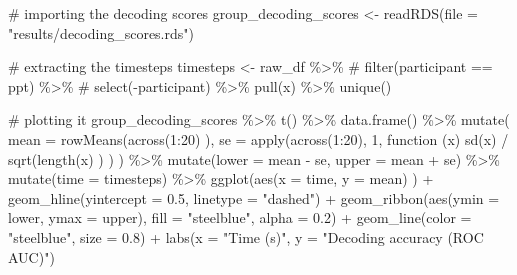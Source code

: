 \documentclass[
  doc,
  floatsintext,
  longtable,
  a4paper,
  nolmodern,
  notxfonts,
  notimes,
  colorlinks=true,linkcolor=blue,citecolor=blue,urlcolor=blue]{apa7}
\newenvironment{Shaded}{\begin{snugshade}}{\end{snugshade}}
\newcommand{\AttributeTok}[1]{\textcolor[rgb]{0.40,0.45,0.13}{#1}}
\newcommand{\CommentTok}[1]{\textcolor[rgb]{0.37,0.37,0.37}{#1}}
\newcommand{\ControlFlowTok}[1]{\textcolor[rgb]{0.00,0.23,0.31}{#1}}
\newcommand{\DecValTok}[1]{\textcolor[rgb]{0.68,0.00,0.00}{#1}}
\newcommand{\FloatTok}[1]{\textcolor[rgb]{0.68,0.00,0.00}{#1}}
\newcommand{\FunctionTok}[1]{\textcolor[rgb]{0.28,0.35,0.67}{#1}}
\newcommand{\NormalTok}[1]{\textcolor[rgb]{0.00,0.23,0.31}{#1}}
\newcommand{\OtherTok}[1]{\textcolor[rgb]{0.00,0.23,0.31}{#1}}
\newcommand{\SpecialCharTok}[1]{\textcolor[rgb]{0.37,0.37,0.37}{#1}}
\newcommand{\StringTok}[1]{\textcolor[rgb]{0.13,0.47,0.30}{#1}}
\begin{document}
\begin{Shaded}
\begin{Highlighting}[]
\CommentTok{\# importing the decoding scores}
\NormalTok{group\_decoding\_scores }\OtherTok{\textless{}{-}} \FunctionTok{readRDS}\NormalTok{(}\AttributeTok{file =} \StringTok{"results/decoding\_scores.rds"}\NormalTok{)}

\CommentTok{\# extracting the timesteps}
\NormalTok{timesteps }\OtherTok{\textless{}{-}}\NormalTok{ raw\_df }\SpecialCharTok{\%\textgreater{}\%}
    \CommentTok{\# filter(participant == ppt) \%\textgreater{}\%}
    \CommentTok{\# select({-}participant) \%\textgreater{}\%}
    \FunctionTok{pull}\NormalTok{(x) }\SpecialCharTok{\%\textgreater{}\%}
    \FunctionTok{unique}\NormalTok{()}

\CommentTok{\# plotting it}
\NormalTok{group\_decoding\_scores }\SpecialCharTok{\%\textgreater{}\%}
    \FunctionTok{t}\NormalTok{() }\SpecialCharTok{\%\textgreater{}\%}
    \FunctionTok{data.frame}\NormalTok{() }\SpecialCharTok{\%\textgreater{}\%}
    \FunctionTok{mutate}\NormalTok{(}
        \AttributeTok{mean =} \FunctionTok{rowMeans}\NormalTok{(}\FunctionTok{across}\NormalTok{(}\DecValTok{1}\SpecialCharTok{:}\DecValTok{20}\NormalTok{) ),}
        \AttributeTok{se =} \FunctionTok{apply}\NormalTok{(}\FunctionTok{across}\NormalTok{(}\DecValTok{1}\SpecialCharTok{:}\DecValTok{20}\NormalTok{), }\DecValTok{1}\NormalTok{, }\ControlFlowTok{function}\NormalTok{ (x) }\FunctionTok{sd}\NormalTok{(x) }\SpecialCharTok{/} \FunctionTok{sqrt}\NormalTok{(}\FunctionTok{length}\NormalTok{(x) ) )}
\NormalTok{        ) }\SpecialCharTok{\%\textgreater{}\%}
    \FunctionTok{mutate}\NormalTok{(}\AttributeTok{lower =}\NormalTok{ mean }\SpecialCharTok{{-}}\NormalTok{ se, }\AttributeTok{upper =}\NormalTok{ mean }\SpecialCharTok{+}\NormalTok{ se) }\SpecialCharTok{\%\textgreater{}\%}
    \FunctionTok{mutate}\NormalTok{(}\AttributeTok{time =}\NormalTok{ timesteps) }\SpecialCharTok{\%\textgreater{}\%}
    \FunctionTok{ggplot}\NormalTok{(}\FunctionTok{aes}\NormalTok{(}\AttributeTok{x =}\NormalTok{ time, }\AttributeTok{y =}\NormalTok{ mean) ) }\SpecialCharTok{+}
    \FunctionTok{geom\_hline}\NormalTok{(}\AttributeTok{yintercept =} \FloatTok{0.5}\NormalTok{, }\AttributeTok{linetype =} \StringTok{"dashed"}\NormalTok{) }\SpecialCharTok{+}
    \FunctionTok{geom\_ribbon}\NormalTok{(}\FunctionTok{aes}\NormalTok{(}\AttributeTok{ymin =}\NormalTok{ lower, }\AttributeTok{ymax =}\NormalTok{ upper), }\AttributeTok{fill =} \StringTok{"steelblue"}\NormalTok{, }\AttributeTok{alpha =} \FloatTok{0.2}\NormalTok{) }\SpecialCharTok{+}
    \FunctionTok{geom\_line}\NormalTok{(}\AttributeTok{color =} \StringTok{"steelblue"}\NormalTok{, }\AttributeTok{size =} \FloatTok{0.8}\NormalTok{) }\SpecialCharTok{+}
    \FunctionTok{labs}\NormalTok{(}\AttributeTok{x =} \StringTok{"Time (s)"}\NormalTok{, }\AttributeTok{y =} \StringTok{"Decoding accuracy (ROC AUC)"}\NormalTok{)}
\end{Highlighting}
\end{Shaded}
\end{document}
